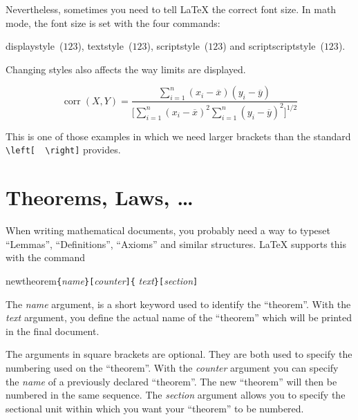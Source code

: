 Nevertheless, sometimes you need to tell \LaTeX{} the correct font
size. In math mode, the font size is set with the four commands:
\begin{center}
{displaystyle}~($\displaystyle 123$),
{textstyle}~($\textstyle 123$), 
{scriptstyle}~($\scriptstyle 123$) and
{scriptscriptstyle}~($\scriptscriptstyle 123$).
\end{center}

Changing styles also affects the way limits are displayed.

\begin{singlespace}
\begin{example}
\begin{displaymath}
\mathop{\mathrm{corr}}(X,Y)= 
 \frac{\displaystyle 
   \sum_{i=1}^n(x_i-\overline x)
   (y_i-\overline y)} 
  {\displaystyle\biggl[
 \sum_{i=1}^n(x_i-\overline x)^2
\sum_{i=1}^n(y_i-\overline y)^2
\biggr]^{1/2}}
\end{displaymath}    
\end{example}
\end{singlespace}

\noindent This is one of those examples in which we need larger
brackets than the standard \verb|\left[  \right]| provides.


\section{Theorems, Laws, \ldots}

When writing mathematical documents, you probably need a way to
typeset ``Lemmas'', ``Definitions'', ``Axioms'' and similar
structures. \LaTeX{} supports this with the command
\begin{command}
{newtheorem}\verb|{|\emph{name}\verb|}[|\emph{counter}\verb|]{|%
         \emph{text}\verb|}[|\emph{section}\verb|]|
\end{command}
The \emph{name} argument, is a short keyword used to identify the
``theorem''. With the \emph{text} argument, you define the actual name
of the ``theorem'' which will be printed in the final document.

The arguments in square brackets are optional. They are both used to
specify the numbering used on the ``theorem''. With the \emph{counter}
argument you can specify the \emph{name} of a previously declared
``theorem''. The new ``theorem'' will then be numbered in the same
sequence.  The \emph{section} argument allows you to specify the
sectional unit within which you want your ``theorem'' to be numbered.

